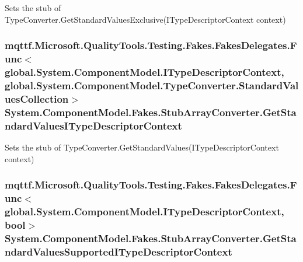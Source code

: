 Sets the stub of Type\-Converter.\-Get\-Standard\-Values\-Exclusive(\-I\-Type\-Descriptor\-Context context)

\hypertarget{class_system_1_1_component_model_1_1_fakes_1_1_stub_array_converter_ac3d315806737d27c6b71a543861c9035}{
\subsubsection[{Get\-Standard\-Values\-I\-Type\-Descriptor\-Context}]{\setlength{\rightskip}{0pt plus 5cm}mqttf.\-Microsoft.\-Quality\-Tools.\-Testing.\-Fakes.\-Fakes\-Delegates.\-Func$<$global.\-System.\-Component\-Model.\-I\-Type\-Descriptor\-Context, global.\-System.\-Component\-Model.\-Type\-Converter.\-Standard\-Values\-Collection$>$ System.\-Component\-Model.\-Fakes.\-Stub\-Array\-Converter.\-Get\-Standard\-Values\-I\-Type\-Descriptor\-Context}}\label{class_system_1_1_component_model_1_1_fakes_1_1_stub_array_converter_ac3d315806737d27c6b71a543861c9035}


Sets the stub of Type\-Converter.\-Get\-Standard\-Values(\-I\-Type\-Descriptor\-Context context)

\hypertarget{class_system_1_1_component_model_1_1_fakes_1_1_stub_array_converter_a27fe811ecd495b8724c61c5d9e484f17}{
\subsubsection[{Get\-Standard\-Values\-Supported\-I\-Type\-Descriptor\-Context}]{\setlength{\rightskip}{0pt plus 5cm}mqttf.\-Microsoft.\-Quality\-Tools.\-Testing.\-Fakes.\-Fakes\-Delegates.\-Func$<$global.\-System.\-Component\-Model.\-I\-Type\-Descriptor\-Context, bool$>$ System.\-Component\-Model.\-Fakes.\-Stub\-Array\-Converter.\-Get\-Standard\-Values\-Supported\-I\-Type\-Descriptor\-Context}}\label{class_system_1_1_component_model_1_1_fakes_1_1_stub_array_converter_a27fe811ecd495b8724c61c5d9e484f17}


